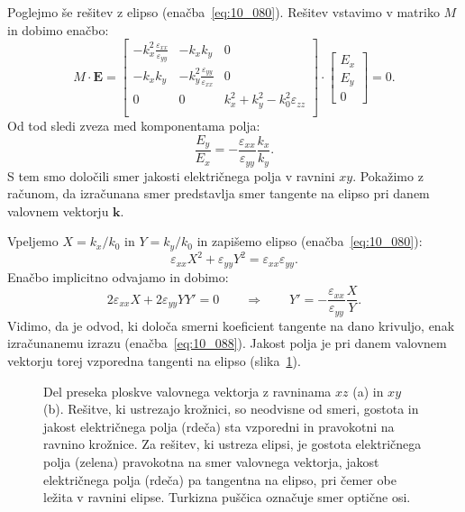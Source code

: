 Poglejmo še rešitev z elipso (enačba~\ref{eq:10_080}). Rešitev vstavimo v matriko $M$ in dobimo
enačbo:
\begin{equation}
M \cdot \mathbf{E}= \left[\begin{array}{ccc}
-k_x^2\frac{\varepsilon_{xx}}{\varepsilon_{yy}} &  - k_xk_y & 0\\
- k_xk_y & -k_y^2\frac{\varepsilon_{yy}}{\varepsilon_{xx}} &0\\
0& 0 & k_x^2+k_y^2  - k_0^2\varepsilon_{zz}\\
\end{array}\right] \cdot
\left[\begin{array}{c}
E_x \\
E_y \\
0
\end{array}\right]=0.
\label{eq:10_087}
\end{equation}
Od tod sledi zveza med komponentama polja:
\begin{equation}
\frac{E_y}{E_x} = -\frac{\varepsilon_{xx}}{\varepsilon_{yy}}\frac{k_x}{k_y}.
\label{eq:10_088}
\end{equation}
S tem smo določili smer jakosti električnega polja v ravnini $xy$. Pokažimo z računom,
da izračunana smer predstavlja smer tangente na elipso pri danem valovnem vektorju $\mathbf{k}$. 

Vpeljemo $X = k_x/k_0$ in $Y = k_y/k_0$
in zapišemo elipso (enačba~\ref{eq:10_080}):
\begin{equation}
\varepsilon_{xx}X^2 + \varepsilon_{yy}Y^2 = \varepsilon_{xx}\varepsilon_{yy}.
\label{eq:10_089}
\end{equation}
Enačbo implicitno odvajamo in dobimo:
\begin{equation}
2\varepsilon_{xx}X + 2\varepsilon_{yy}Y Y' = 0 \qquad \Longrightarrow \qquad 
Y' = - \frac{\varepsilon_{xx}}{\varepsilon_{yy}} \frac{X}{Y}.
\label{eq:10_090}
\end{equation}
Vidimo, da je odvod, ki določa smerni koeficient tangente na dano krivuljo, enak
izračunanemu izrazu (enačba~\ref{eq:10_088}). Jakost polja je pri danem valovnem vektorju torej
vzporedna tangenti na elipso (slika~\ref{fig:10_ploskev_tangenta}).
\begin{figure}[ht]
\centering
\def\svgwidth{130truemm} 

\caption{Del preseka ploskve valovnega vektorja z ravninama $xz$ (a) in $xy$ (b). 
Rešitve, ki ustrezajo krožnici, so neodvisne od smeri, gostota in jakost 
električnega polja (rdeča) sta vzporedni in pravokotni na ravnino krožnice. 
Za rešitev, ki ustreza elipsi, je gostota električnega polja (zelena) pravokotna 
na smer valovnega vektorja, jakost električnega polja (rdeča) pa tangentna 
na elipso, pri čemer obe ležita v ravnini elipse.
Turkizna puščica označuje smer optične osi.}
\label{fig:10_ploskev_tangenta}
\end{figure}

